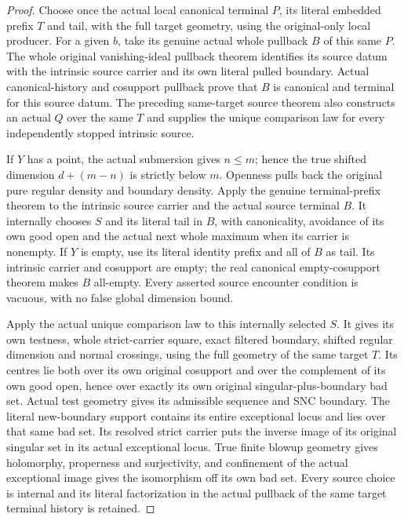 \begin{proof}
Choose once the actual local canonical terminal $P$, its literal
embedded prefix $T$ and tail, with the full target geometry, using the
original-only local producer. For a given $b$, take its genuine actual
whole pullback $B$ of this same $P$. The whole original vanishing-ideal
pullback theorem identifies its source datum with the intrinsic source
carrier and its own literal pulled boundary. Actual canonical-history
and cosupport pullback prove that $B$ is canonical and terminal for
this source datum. The preceding same-target source theorem also
constructs an actual $Q$ over the same $T$ and supplies the unique
comparison law for every independently stopped intrinsic source.

If $Y$ has a point, the actual submersion gives $n\le m$; hence the
true shifted dimension $d+(m-n)$ is strictly below $m$. Openness pulls
back the original pure regular density and boundary density. Apply
the genuine terminal-prefix theorem to the intrinsic source carrier
and the actual source terminal $B$. It internally chooses $S$ and its
literal tail in $B$, with canonicality, avoidance of its own good
open and the actual next whole maximum when its carrier is nonempty.
If $Y$ is empty, use its literal identity prefix and all of $B$ as
tail. Its intrinsic carrier and cosupport are empty; the real canonical
empty-cosupport theorem makes $B$ all-empty. Every asserted source
encounter condition is vacuous, with no false global dimension bound.

Apply the actual unique comparison law to this internally selected
$S$. It gives its own testness, whole strict-carrier square, exact
filtered boundary, shifted regular dimension and normal crossings,
using the full geometry of the same target $T$. Its centres lie both
over its own original cosupport and over the complement of its own
good open, hence over exactly its own original singular-plus-boundary
bad set. Actual test geometry gives its admissible sequence and SNC
boundary. The literal new-boundary support contains its entire
exceptional locus and lies over that same bad set. Its resolved
strict carrier puts the inverse image of its original singular set
in its actual exceptional locus. True finite blowup geometry gives
holomorphy, properness and surjectivity, and confinement of the actual
exceptional image gives the isomorphism off its own bad set. Every
source choice is internal and its literal factorization in the actual
pullback of the same target terminal history is retained.
\end{proof}

